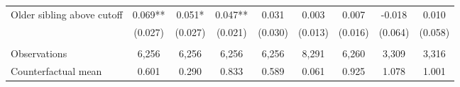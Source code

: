 {{\begin{tabular}{lcccccccc}
Older sibling above cutoff&       0.069** &       0.051*  &       0.047** &       0.031   &       0.003   &       0.007   &      -0.018   &       0.010   \\
                    &     (0.027)   &     (0.027)   &     (0.021)   &     (0.030)   &     (0.013)   &     (0.016)   &     (0.064)   &     (0.058)   \\
                    &               &               &               &               &               &               &               &               \\
Observations        &       6,256   &       6,256   &       6,256   &       6,256   &       8,291   &       6,260   &       3,309   &       3,316   \\
Counterfactual mean &       0.601   &       0.290   &       0.833   &       0.589   &       0.061   &       0.925   &       1.078   &       1.001   \\
 

\bottomrule
\end{tabular}
}
}
